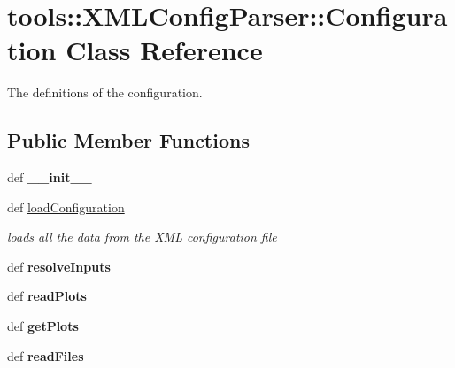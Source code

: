 \hypertarget{classtools_1_1XMLConfigParser_1_1Configuration}{
\section{tools::XMLConfigParser::Configuration Class Reference}
\label{classtools_1_1XMLConfigParser_1_1Configuration}
}
The definitions of the configuration.  


\subsection*{Public Member Functions}
\begin{CompactItemize}
\item 
\hypertarget{classtools_1_1XMLConfigParser_1_1Configuration_11edd8ecac85677c236494f0c0e2f3a3}{
def \textbf{\_\-\_\-init\_\-\_\-}}
\label{classtools_1_1XMLConfigParser_1_1Configuration_11edd8ecac85677c236494f0c0e2f3a3}

\item 
def \hyperlink{classtools_1_1XMLConfigParser_1_1Configuration_7b585a1138fb8a821c50d227878250d4}{loadConfiguration}
\begin{CompactList}\small\item\em loads all the data from the XML configuration file \item\end{CompactList}\item 
\hypertarget{classtools_1_1XMLConfigParser_1_1Configuration_b6800884d6b88f5b36c02af0aa86f0c8}{
def \textbf{resolveInputs}}
\label{classtools_1_1XMLConfigParser_1_1Configuration_b6800884d6b88f5b36c02af0aa86f0c8}

\item 
\hypertarget{classtools_1_1XMLConfigParser_1_1Configuration_9b01de88a460794e4bbe17578bf0e8df}{
def \textbf{readPlots}}
\label{classtools_1_1XMLConfigParser_1_1Configuration_9b01de88a460794e4bbe17578bf0e8df}

\item 
\hypertarget{classtools_1_1XMLConfigParser_1_1Configuration_8c8567d79d7b15b5e548a9a242bc8c88}{
def \textbf{getPlots}}
\label{classtools_1_1XMLConfigParser_1_1Configuration_8c8567d79d7b15b5e548a9a242bc8c88}

\item 
\hypertarget{classtools_1_1XMLConfigParser_1_1Configuration_ea6411bfcb8694178195462a6b9a9ee6}{
def \textbf{readFiles}}
\label{classtools_1_1XMLConfigParser_1_1Configuration_ea6411bfcb8694178195462a6b9a9ee6}


\end{CompactItemize}

